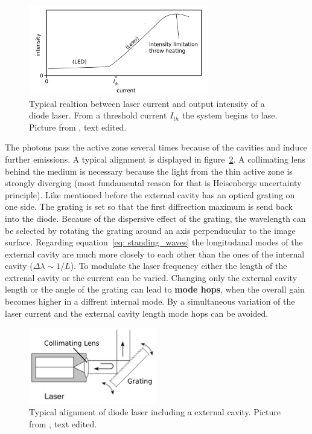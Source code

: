 \begin{figure}
  \centering
  \includegraphics[width = 0.7\textwidth]{pics/threshold.png}
  \caption{Typical realtion between laser current and output intensity of a diode laser. From a threshold current 
  $I_{th}$ the system begins to lase. Picture from \cite{eichler}, text edited.}
  \label{fig: threshold}
\end{figure}

The photons pass the active zone several times because of the cavities and induce further emissions. A typical alignment is displayed in figure~\ref{fig: cavity}.
A collimating lens behind the medium is necessary because the light from the thin active zone is strongly diverging (most 
fundamental reason for that is Heisenbergs uncertainty principle).
Like mentioned before the external cavity has an optical grating on one side. The grating is set so that the first diffrection maximum is send back into the
diode. Because of the dispersive effect of the grating, the wavelength can be selected by rotating the grating around an axis perpenducular
to the image surface. Regarding equation~\eqref{eq: standing_waves} the longitudanal modes of the external cavity are much
more closely to each other than the ones of the internal cavity ($\Delta \lambda \sim 1 / L$).
To modulate the laser frequency either the length of the extrenal cavity or the current can be varied.
Changing only the external cavity length or the angle of the grating can lead to \textbf{mode hops}, when the overall gain becomes higher
in a diffrent internal mode. By a simultaneous variation of the laser current and the external cavity length mode hops can be avoided.

\begin{figure}
  \centering
  \includegraphics[width = 0.5\textwidth]{pics/cavity.pdf}
  \caption{Typical alignment of diode laser including a external cavity. 
  Picture from \cite{eichler}, text edited.}
  \label{fig: cavity}
\end{figure}